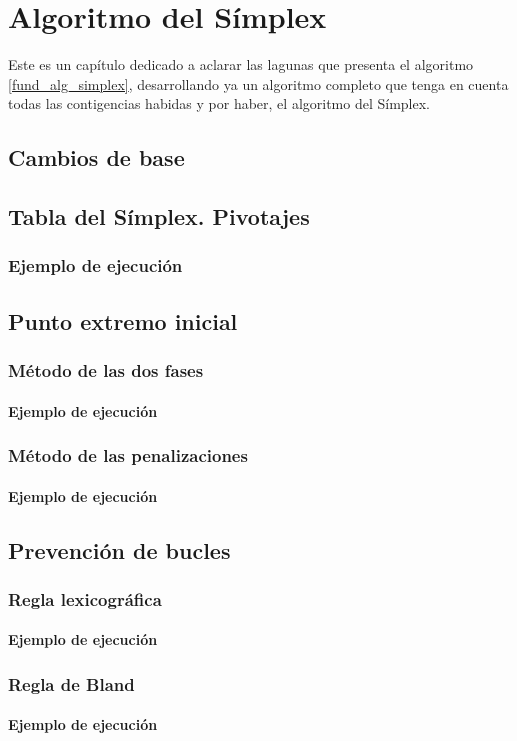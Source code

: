 \chapter{Algoritmo del Símplex}
\label{simp}
Este es un capítulo dedicado a aclarar las lagunas que presenta el algoritmo \ref{fund_alg_simplex}, desarrollando ya un algoritmo completo que tenga en cuenta todas las contigencias habidas y por haber, el algoritmo del Símplex.
\section{Cambios de base}
\section{Tabla del Símplex. Pivotajes}
\subsection{Ejemplo de ejecución}
\section{Punto extremo inicial}
\subsection{Método de las dos fases}
\subsubsection{Ejemplo de ejecución}
\subsection{Método de las penalizaciones}
\subsubsection{Ejemplo de ejecución}
\section{Prevención de bucles}
\subsection{Regla lexicográfica}
\subsubsection{Ejemplo de ejecución}
\subsection{Regla de Bland}
\subsubsection{Ejemplo de ejecución}